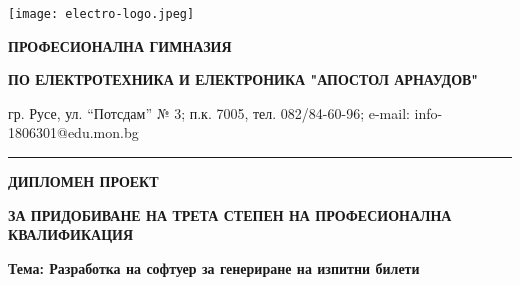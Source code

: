 \addtocounter{page}{-1}

\begin{changemargin}{-2cm}{-2cm}
\setlength{\columnsep}{-16cm}
\begin{multicols}{2}
    \texttt{[image: electro-logo.jpeg]}

    \vfill\null\columnbreak  %

    \begin{center}
        \begin{footnotesize}
        \textbf{ПРОФЕСИОНАЛНА ГИМНАЗИЯ}

        \textbf{ПО ЕЛЕКТРОТЕХНИКА И ЕЛЕКТРОНИКА "АПОСТОЛ АРНАУДОВ"}

        гр. Русе, ул. “Потсдам” № 3; п.к. 7005, тел. 082/84-60-96; e-mail: info-1806301@edu.mon.bg
        \end{footnotesize}
    \end{center}

\end{multicols}
\end{changemargin}

\begin{spacing}{0}
\par\noindent\rule{\textwidth}{0.4pt}
\end{spacing}

\hfill \break
\hfill \break

\begin{center}

\begin{huge}
\textbf{ДИПЛОМЕН ПРОЕКТ}
\end{huge}

\hfill

\begin{small}
\textbf{ЗА ПРИДОБИВАНЕ НА ТРЕТА СТЕПЕН НА ПРОФЕСИОНАЛНА КВАЛИФИКАЦИЯ}
\end{small}

\hfill \break

\hfill \break

\hfill \break

\hfill \break

\hfill \break

\begin{LARGE}
\textbf{Тема: Разработка на софтуер за генериране на изпитни билети}
\end{LARGE}

\end{center}

